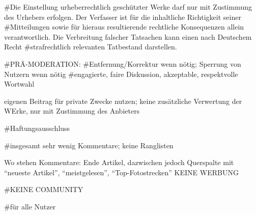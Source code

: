 #Die Einstellung urheberrechtlich geschützter Werke darf nur mit Zustimmung des Urhebers erfolgen. Der Verfasser ist für die inhaltliche Richtigkeit seiner #Mitteilungen sowie für hieraus resultierende rechtliche Konsequenzen allein verantwortlich. Die Verbreitung falscher Tatsachen kann einen nach Deutschem Recht #strafrechtlich relevanten Tatbestand darstellen.

#PRÄ-MODERATION:
#Entfernung/Korrektur wenn nötig; Sperrung von Nutzern wenn nötig
#engagierte, faire Diskussion, akzeptable, respektvolle Wortwahl


eigenen Beitrag für private Zwecke nutzen; keine zusätzliche Verwertung der WErke, nur mit Zustimmung des Anbieters

#Haftungsausschluss

#insgesamt sehr wenig Kommentare; keine Ranglisten

Wo stehen Kommentare: Ende Artikel, dazwischen jedoch Querspalte mit ``neueste Artikel'', ``meistgelesen'', ``Top-Fotostrecken'' KEINE WERBUNG

#KEINE COMMUNITY

#für alle Nutzer